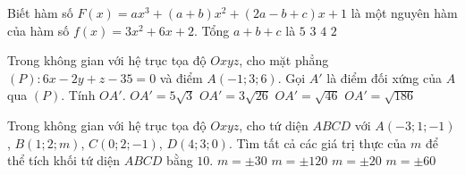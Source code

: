\begin{ex}%
Biết hàm số $F(x)=ax^3+(a+b)x^2+(2a-b+c)x+1$ là một nguyên hàm của hàm số $f(x)=3x^2+6x+2$. Tổng $a+b+c$ là
\choice
{\True $5$}
{$3$}
{$4$}
{$2$}
\end{ex}

\begin{ex}%
Trong không gian với hệ trục tọa độ $Oxyz$, cho mặt phẳng $(P)\colon 6x-2y+z-35=0$ và điểm $A(-1;3;6)$. Gọi $A'$ là điểm đối xứng của $A$ qua $(P)$. Tính $OA'$.
\choice
{$OA'=5\sqrt3$}
{$OA'=3\sqrt{26}$}
{$OA'=\sqrt{46}$}
{\True $OA'=\sqrt{186}$}
\end{ex}

\begin{ex}%
Trong không gian với hệ trục tọa độ $Oxyz$, cho tứ diện $ABCD$ với $A(-3;1;-1)$, $B(1;2;m)$, $C(0;2;-1)$, $D(4;3;0)$. Tìm tất cả các giá trị thực của $m$ để thể tích khối tứ diện $ABCD$ bằng $10$.
\choice
{$m=\pm30$}
{$m=\pm120$}
{$m=\pm20$}
{\True $m=\pm60$}
\end{ex}

